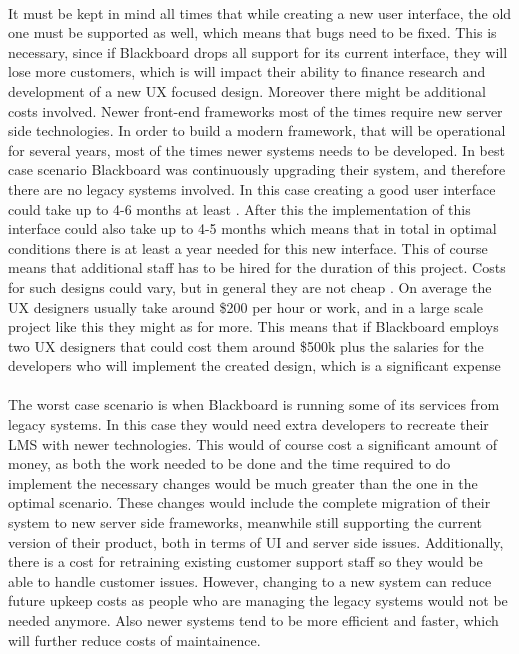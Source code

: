 \documentclass[]{article}
\begin{document}
\paragraph{}
It must be kept in mind all times that while creating a new user interface, the old one must be supported as well, which means that bugs need to be fixed. This is necessary, since if Blackboard drops all support for its current interface, they will lose more customers, which is will impact their ability to finance research and development of a new UX focused design. Moreover there might be additional costs involved. Newer front-end frameworks most of the times require new server side technologies. In order to build a modern framework, that will be operational for several years, most of the times newer systems needs to be developed. In best case scenario Blackboard was continuously upgrading their system, and therefore there are no legacy systems involved. In this case creating a good user interface could take up to 4-6 months at least \cite{UX-30000}. After this the implementation of this interface could also take up to 4-5 months \cite{Webredesign-adv} which means that in total in optimal conditions there is at least a year needed for this new interface. This of course means that additional staff has to be hired for the duration of this project. Costs for such designs could vary, but in general they are not cheap \cite{UX-cost}. On average the UX designers usually take around \$200 per hour or work, and in a large scale project like this they might as for more. This means that if Blackboard employs two UX designers that could cost them around \$500k plus the salaries for the developers who will implement the created design, which is a significant expense 

\paragraph{}
The worst case scenario is when Blackboard is running some of its services from legacy systems. In this case they would need extra developers to recreate their LMS with newer technologies. This would of course cost a significant amount of money, as both the work needed to be done and the time required to do implement the necessary changes would be much greater than the one in the optimal scenario. These changes would include the complete migration of their system to new server side frameworks, meanwhile still supporting the current version of their product, both in terms of UI and server side issues. Additionally, there is a cost for retraining existing customer support staff so they would be able to handle customer issues. However, changing to a new system can reduce future upkeep costs as people who are managing the legacy systems would not be needed anymore. Also newer systems tend to be more efficient and faster, which will further reduce costs of maintainence. 
\end{document}

